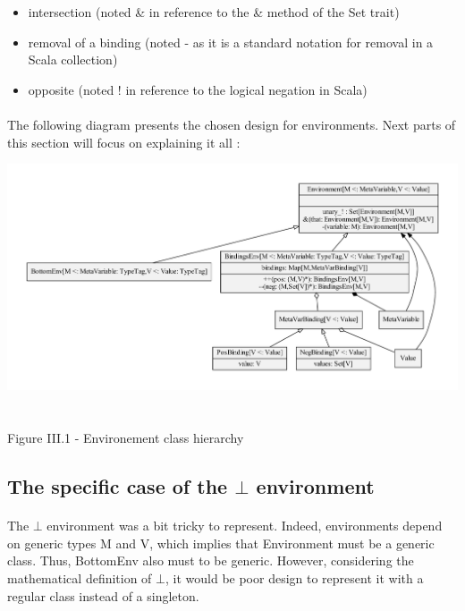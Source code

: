 \documentclass{report}
\begin{document}
\vspace{1.5mm}
\begin{itemize}
\item intersection (noted \& in reference to the \& method of the Set trait)\vspace{1mm}
\item removal of a binding (noted - as it is a standard notation for removal in a Scala collection)\vspace{1mm}
\item opposite (noted ! in reference to the logical negation in Scala)\vspace{1mm}
\end{itemize}

\paragraph{}
\hspace{4mm}The following diagram presents the chosen design for environments. Next parts of this section will focus on explaining it all :

\begin{center}
\includegraphics[scale=0.5]{data/Env}
~\\~\\Figure III.1 - Environement class hierarchy
\end{center}

\subsection{The specific case of the $\bot$ environment}

\paragraph{}
\hspace{4mm}The $\bot$ environment was a bit tricky to represent. Indeed, environments depend on generic types
M and V, which implies that Environment must be a generic class. Thus, BottomEnv also must to be generic. However, 
considering the mathematical definition of $\bot$, it would be poor design to represent it with a regular class instead of a singleton.
\end{document}
